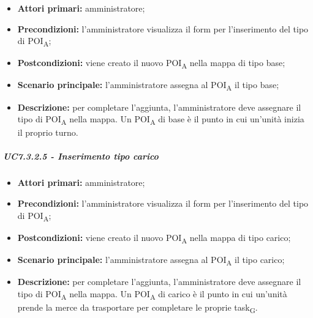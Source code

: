 \begin{itemize}

   \item   \textbf{Attori primari:} amministratore;

   \item   \textbf{Precondizioni:} l'amministratore visualizza il form per l'inserimento del tipo di POI\textsubscript{A};

   \item   \textbf{Postcondizioni:} viene creato il nuovo POI\textsubscript{A} nella mappa di tipo base; 

   \item   \textbf{Scenario principale:} l'amministratore assegna al POI\textsubscript{A} il tipo base;

   \item   \textbf{Descrizione:} per completare l'aggiunta, l'amministratore deve assegnare il tipo di POI\textsubscript{A} nella mappa. Un POI\textsubscript{A} di base è il punto in cui un'unità inizia il proprio turno.



\end{itemize}



\subparagraph{UC7.3.2.5 - Inserimento tipo carico}

\begin{itemize}

   \item   \textbf{Attori primari:} amministratore;

   \item   \textbf{Precondizioni:} l'amministratore visualizza il form per l'inserimento del tipo di POI\textsubscript{A};

   \item   \textbf{Postcondizioni:} viene creato il nuovo POI\textsubscript{A} nella mappa di tipo carico; 

 \item   \textbf{Scenario principale:} l'amministratore assegna al POI\textsubscript{A} il tipo carico;

   \item   \textbf{Descrizione:} per completare l'aggiunta, l'amministratore deve assegnare il tipo di POI\textsubscript{A} nella mappa. Un POI\textsubscript{A} di carico è il punto in cui un'unità prende la merce da trasportare per completare le proprie task\textsubscript{G}.



\end{itemize}



